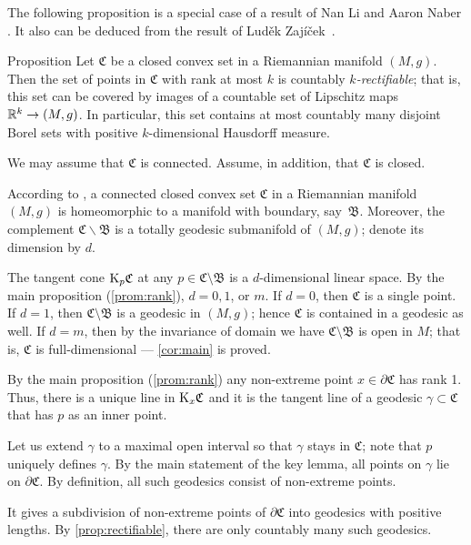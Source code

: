 \documentclass[a4paper,10pt]{article}
\begin{document}
The following proposition is a special case of a result of Nan Li and Aaron Naber \cite[Theorem 1.6]{li-naber}.
It also can be deduced from the result of Luděk 
Zajíček~\cite{zajicek}.

\begin{thm}{Proposition}\label{prop:rectifiable}
Let $\mathfrak{C}$ be a closed convex set in a Riemannian manifold $(M,g)$.
Then the set of points in $\mathfrak{C}$ with rank at most $k$ is countably \emph{$k$-rectifiable};
that is, this set can be  covered by images of a countable set of Lipschitz maps $\mathbb{R}^k\to (M,g)$.
In particular, this set contains at most countably many disjoint Borel sets with positive $k$-dimensional Hausdorff measure.
\end{thm}

We may assume that $\mathfrak {C}$ is connected. Assume, in addition, that  $\mathfrak{C}$ is closed.

According to \cite[Theorem 1.6]{cheeger-gromoll}, a connected closed convex set $\mathfrak{C}$ in a Riemannian manifold $(M,g)$ is homeomorphic to a manifold with boundary, say~$\mathfrak{B}$.
Moreover, the complement $\mathfrak{C}\backslash \mathfrak{B}$ is a totally geodesic submanifold of $(M,g)$; denote its dimension by $d$.

The tangent cone $\mathrm{K}_p \mathfrak C$ at any $p \in \mathfrak C\setminus \mathfrak B$ is a $d$-dimensional linear space.
By the main proposition (\ref{prom:rank}), $d=0, 1$, or $m$.
If $d=0$, then $\mathfrak{C}$ is a single point.
If $d=1$, then $\mathfrak C\setminus \mathfrak B$ is a  geodesic in $(M,g)$;
hence $\mathfrak C$ is contained in a  geodesic as well.
If $d=m$, then by the invariance of domain we have  $\mathfrak C\setminus \mathfrak B$ is open in $M$; that is, $\mathfrak C$ is full-dimensional --- \ref{cor:main} is proved.

By the main proposition (\ref{prom:rank}) any non-extreme point $x\in \partial \mathfrak C$ has rank 1.
Thus, there is a unique line in $\mathrm{K}_x\mathfrak C$ and it is the tangent line of a geodesic $\gamma\subset\mathfrak C$ that has $p$ as an inner point. 

Let us extend $\gamma$ to a maximal open interval so that $\gamma$ stays in $\mathfrak C$;
note that $p$ uniquely defines $\gamma$. 
By the main statement of the key lemma, all points on $\gamma$ lie on $\partial \mathfrak C$.
By definition, all such geodesics consist of non-extreme points.

It gives a subdivision of non-extreme points of $\partial\mathfrak C$ into geodesics with positive lengths.
By \ref{prop:rectifiable}, there are only countably many such geodesics.
\end{document}
